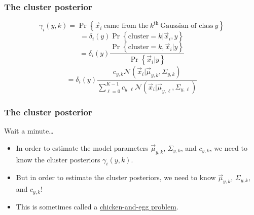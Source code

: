 \documentclass{beamer}
\begin{document}
\begin{frame}
  \frametitle{The cluster posterior}

  \begin{displaymath}
    \gamma_i(y,k)
    =\Pr\left\{\vec{x}_i~\mbox{came from the}~k^{\textrm{th}}~\mbox{Gaussian of class}~y\right\}
  \end{displaymath}
  \begin{displaymath}
    =\delta_i(y)\Pr\left\{\mbox{cluster}=k|\vec{x}_i,y\right\}
  \end{displaymath}
  \begin{displaymath}
    =\delta_i(y)\frac{\Pr\left\{\mbox{cluster}=k,\vec{x}_i|y\right\}}{\Pr\left\{\vec{x}_i|y\right\}}
  \end{displaymath}
  \begin{displaymath}
    =\delta_i(y)\frac{c_{y,k} {\mathcal N}(\vec{x}_i|\vec\mu_{y,k},\Sigma_{y,k})}{\sum_{\ell=0}^{K-1}c_{y,\ell} {\mathcal N}(\vec{x}_i|\vec\mu_{y,\ell},\Sigma_{y,\ell})}
  \end{displaymath}
\end{frame}

\begin{frame}
  \frametitle{The cluster posterior}

  Wait a minute\ldots
  \begin{itemize}
  \item
    In order to estimate the model parameters $\vec\mu_{y,k}$,
    $\Sigma_{y,k}$, and $c_{y,k}$, we need to know the cluster
    posteriors $\gamma_i(y,k)$.
  \item
    But in order to estimate the cluster posteriors, we need to know
    $\vec\mu_{y,k}$, $\Sigma_{y,k}$, and $c_{y,k}$!
  \item
    This is sometimes called a \href{https://en.wikipedia.org/wiki/Chicken_or_the_egg}{\color{blue} chicken-and-egg problem}.
  \end{itemize}
\end{frame}
\end{document}
